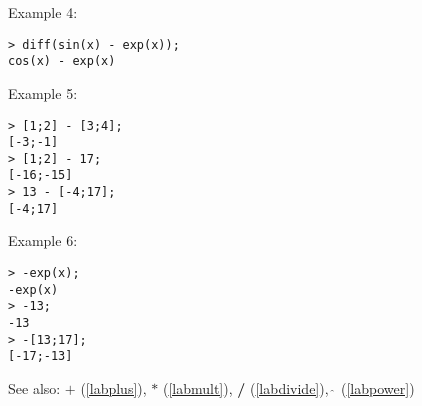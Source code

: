 \noindent Example 4: 
\begin{center}\begin{minipage}{15cm}\begin{Verbatim}[frame=single,commandchars=\\\|\~]
> diff(sin(x) - exp(x));
cos(x) - exp(x)
\end{Verbatim}
\end{minipage}\end{center}
\noindent Example 5: 
\begin{center}\begin{minipage}{15cm}\begin{Verbatim}[frame=single,commandchars=\\\|\~]
> [1;2] - [3;4];
[-3;-1]
> [1;2] - 17;
[-16;-15]
> 13 - [-4;17];
[-4;17]
\end{Verbatim}
\end{minipage}\end{center}
\noindent Example 6: 
\begin{center}\begin{minipage}{15cm}\begin{Verbatim}[frame=single,commandchars=\\\|\~]
> -exp(x);
-exp(x)
> -13;
-13
> -[13;17];
[-17;-13]
\end{Verbatim}
\end{minipage}\end{center}
See also: \textbf{$+$} (\ref{labplus}), \textbf{$*$} (\ref{labmult}), \textbf{/} (\ref{labdivide}), \textbf{$\mathbf{\hat{~}}$} (\ref{labpower})
